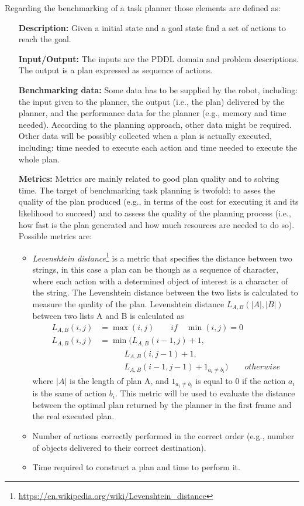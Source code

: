Regarding the benchmarking of a task planner those elements are defined as:
\begin{itemize}
\item [\textbf{Description:}] Given a initial state and a goal state find a set of actions to reach the goal.
\item [\textbf{Input/Output:}] The inputs are the PDDL domain and problem descriptions. The output is a plan expressed as sequence of actions.
\item [\textbf{Benchmarking data:}] Some data has to be supplied by the robot, including: the input
given to the planner, the output (i.e., the plan) delivered by the planner, and the
performance data for the planner (e.g., memory and time needed). According to
the planning approach, other data might be required. Other data will be possibly collected when a plan is
actually executed, including: time needed to execute each action and time needed
to execute the whole plan.
\item [\textbf{Metrics:}] Metrics are mainly related to good plan quality and to solving time. The target of benchmarking task planning is twofold: to asses the quality of the
plan produced (e.g., in terms of the cost for executing it and its likelihood to succeed) and to assess the quality of the
planning process (i.e., how fast is the plan generated and how much resources are needed to do so). Possible metrics are:
\begin{itemize}
\item \textsl{Levenshtein distance}\footnote{\href{https://en.wikipedia.org/wiki/Levenshtein_distance} {https://en.wikipedia.org/wiki/Levenshtein\_distance}} is a metric that specifies the distance between two strings, in this case a plan can be though as a sequence of character, where each action with a determined object of interest is a character of the string. The Levenshtein distance between the two lists is calculated to measure the quality of the plan. Levenshtein distance
$L_{A,B}(|A|,|B|)$ between two lists A and B is calculated as
\begin{align*}
L_{A,B}(i,j) &= \max(i,j) \qquad if \quad \min(i,j)=0 \\
L_{A,B}(i,j) &= \min(L_{A,B}(i-1,j)+1, \\
& \qquad \quad L_{A,B}(i,j-1)+1,
\\ & \qquad \quad L_{A,B}(i-1,j-1)+1_{a_i \neq b_i})
\qquad otherwise
\end{align*}
where $|A|$ is the length of plan A, and $1_{a_i \neq b_i}$ is equal to 0 if the action $a_i$ is the same of action $b_i$. This metric will be used to evaluate the distance between the optimal plan returned by the planner in the first frame and the real executed plan. 
\item Number of actions correctly performed in the correct order (e.g., number of
objects delivered to their correct destination). 
\item Time required to construct a plan and time to perform it. 
\end{itemize}
\end{itemize}
